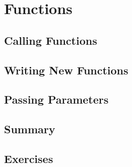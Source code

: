 \chapter{Functions}

\section{Calling Functions}


\section{Writing New Functions}



\section{Passing Parameters}

\section{Summary}


\section{Exercises}

